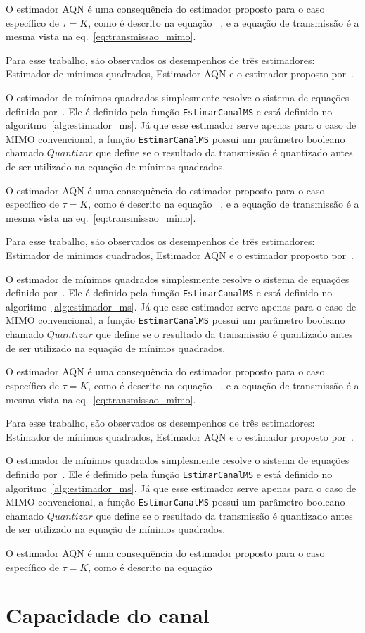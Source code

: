 \documentclass{article}
\begin{document}
O estimador AQN é uma consequência do estimador proposto para o caso específico de $\tau=K$, como é descrito na equação~\cite[eq]{li.ets} 
, e a equação de transmissão é a mesma vista na eq.~\eqref{eq:transmissao_mimo}. 

Para esse trabalho, são observados os desempenhos de três estimadores: Estimador de mínimos quadrados, Estimador AQN e o estimador proposto por~\cite{li.etal_2017a}. 

O estimador de mínimos quadrados simplesmente resolve o sistema de equações definido por~\cite[eq. 4]{li.etal_2017a}. Ele é definido pela função \texttt{EstimarCanalMS} e está definido no algoritmo~\ref{alg:estimador_ms}. Já que esse estimador serve apenas para o caso de MIMO convencional, a função \texttt{EstimarCanalMS} possui um parâmetro booleano chamado $Quantizar$ que define se o resultado da transmissão é quantizado antes de ser utilizado na equação de mínimos quadrados. 

O estimador AQN é uma consequência do estimador proposto para o caso específico de $\tau=K$, como é descrito na equação~\cite[eq]{li.ets} 
, e a equação de transmissão é a mesma vista na eq.~\eqref{eq:transmissao_mimo}. 

Para esse trabalho, são observados os desempenhos de três estimadores: Estimador de mínimos quadrados, Estimador AQN e o estimador proposto por~\cite{li.etal_2017a}. 

O estimador de mínimos quadrados simplesmente resolve o sistema de equações definido por~\cite[eq. 4]{li.etal_2017a}. Ele é definido pela função \texttt{EstimarCanalMS} e está definido no algoritmo~\ref{alg:estimador_ms}. Já que esse estimador serve apenas para o caso de MIMO convencional, a função \texttt{EstimarCanalMS} possui um parâmetro booleano chamado $Quantizar$ que define se o resultado da transmissão é quantizado antes de ser utilizado na equação de mínimos quadrados. 

O estimador AQN é uma consequência do estimador proposto para o caso específico de $\tau=K$, como é descrito na equação~\cite[eq]{li.ets} 
, e a equação de transmissão é a mesma vista na eq.~\eqref{eq:transmissao_mimo}. 

Para esse trabalho, são observados os desempenhos de três estimadores: Estimador de mínimos quadrados, Estimador AQN e o estimador proposto por~\cite{li.etal_2017a}. 

O estimador de mínimos quadrados simplesmente resolve o sistema de equações definido por~\cite[eq. 4]{li.etal_2017a}. Ele é definido pela função \texttt{EstimarCanalMS} e está definido no algoritmo~\ref{alg:estimador_ms}. Já que esse estimador serve apenas para o caso de MIMO convencional, a função \texttt{EstimarCanalMS} possui um parâmetro booleano chamado $Quantizar$ que define se o resultado da transmissão é quantizado antes de ser utilizado na equação de mínimos quadrados. 

O estimador AQN é uma consequência do estimador proposto para o caso específico de $\tau=K$, como é descrito na equação~\cite[eq]{li.ets} 

\section{Capacidade do canal}
\label{sec:capacidade_canal}


\end{document}
